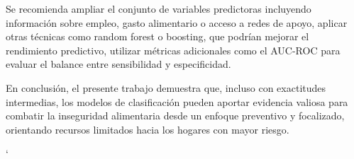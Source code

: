 \documentclass[Royal,times,sageh]{sagej}
\begin{document}
Se recomienda ampliar el conjunto de variables predictoras incluyendo
información sobre empleo, gasto alimentario o acceso a redes de apoyo,
aplicar otras técnicas como random forest o boosting, que podrían
mejorar el rendimiento predictivo, utilizar métricas adicionales como el
AUC-ROC para evaluar el balance entre sensibilidad y especificidad.

En conclusión, el presente trabajo demuestra que, incluso con
exactitudes intermedias, los modelos de clasificación pueden aportar
evidencia valiosa para combatir la inseguridad alimentaria desde un
enfoque preventivo y focalizado, orientando recursos limitados hacia los
hogares con mayor riesgo.

\newpage

`



\end{document}
